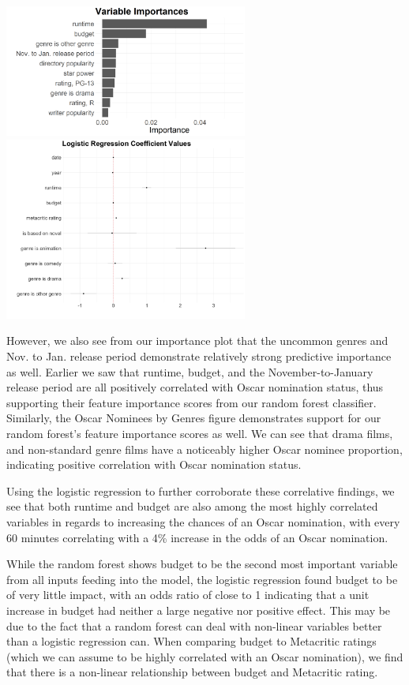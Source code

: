 \documentclass[10pt]{article}
\begin{document}
\begin{center}
\includegraphics[width=8cm]{_assets/predictive_analysis/variable_importance_rf_osc_nom.png}
\hspace{1cm}
\includegraphics[width=8cm]{_assets/log-reg-plots/dwplot.png}
\end{center}

However, we also see from our importance plot that the uncommon genres and Nov. to Jan. release period demonstrate relatively strong predictive importance as well. Earlier we saw that runtime, budget, and the November-to-January release period are all positively correlated with Oscar nomination status, thus supporting their feature importance scores from our random forest classifier. Similarly, the Oscar Nominees by Genres figure demonstrates support for our random forest’s feature importance scores as well. We can see that drama films, and non-standard genre films have a noticeably higher Oscar nominee proportion, indicating positive correlation with Oscar nomination status.

Using the logistic regression to further corroborate these correlative findings, we see that both runtime and budget are also among the most highly correlated variables in regards to increasing the chances of an Oscar nomination, with every 60 minutes correlating with a 4\% increase in the odds of an Oscar nomination.

While the random forest shows budget to be the second most important variable from all inputs feeding into the model, the logistic regression found budget to be of very little impact, with an odds ratio of close to 1 indicating that a unit increase in budget had neither a large negative nor positive effect. This may be due to the fact that a random forest can deal with non-linear variables better than a logistic regression can. When comparing budget to Metacritic ratings (which we can assume to be highly correlated with an Oscar nomination), we find that there is a non-linear relationship between budget and Metacritic rating.
\end{document}
